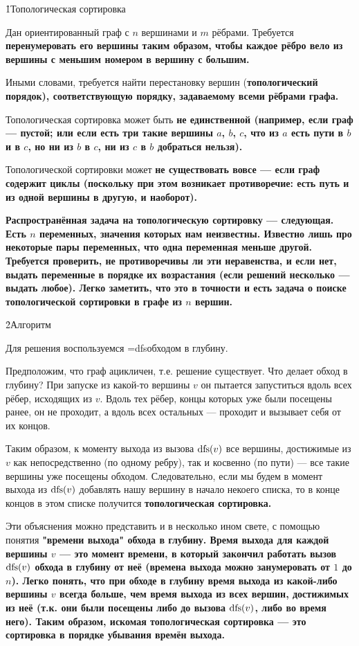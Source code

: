 \h1{Топологическая сортировка}

Дан ориентированный граф с $n$ вершинами и $m$ рёбрами. Требуется \bf{перенумеровать} его вершины таким образом, чтобы каждое рёбро вело из вершины с меньшим номером в вершину с большим.

Иными словами, требуется найти перестановку вершин (\bf{топологический порядок}), соответствующую порядку, задаваемому всеми рёбрами графа.

Топологическая сортировка может быть \bf{не единственной} (например, если граф --- пустой; или если есть три такие вершины $a$, $b$, $c$, что из $a$ есть пути в $b$ и в $c$, но ни из $b$ в $c$, ни из $c$ в $b$ добраться нельзя).

Топологической сортировки может \bf{не существовать} вовсе --- если граф содержит циклы (поскольку при этом возникает противоречие: есть путь и из одной вершины в другую, и наоборот).

\bf{Распространённая задача} на топологическую сортировку --- следующая. Есть $n$ переменных, значения которых нам неизвестны. Известно лишь про некоторые пары переменных, что одна переменная меньше другой. Требуется проверить, не противоречивы ли эти неравенства, и если нет, выдать переменные в порядке их возрастания (если решений несколько --- выдать любое). Легко заметить, что это в точности и есть задача о поиске топологической сортировки в графе из $n$ вершин.


\h2{Алгоритм}

Для решения воспользуемся \algohref=dfs{обходом в глубину}.

Предположим, что граф ацикличен, т.е. решение существует. Что делает обход в глубину? При запуске из какой-то вершины $v$ он пытается запуститься вдоль всех рёбер, исходящих из $v$. Вдоль тех рёбер, концы которых уже были посещены ранее, он не проходит, а вдоль всех остальных --- проходит и вызывает себя от их концов.

Таким образом, к моменту выхода из вызова ${\rm dfs}(v)$ все вершины, достижимые из $v$ как непосредственно (по одному ребру), так и косвенно (по пути) --- все такие вершины уже посещены обходом. Следовательно, если мы будем в момент выхода из ${\rm dfs}(v)$ добавлять нашу вершину в начало некоего списка, то в конце концов в этом списке получится \bf{топологическая сортировка}.

Эти объяснения можно представить и в несколько ином свете, с помощью понятия \bf{"времени выхода"} обхода в глубину. Время выхода для каждой вершины $v$ --- это момент времени, в который закончил работать вызов ${\rm dfs}(v)$ обхода в глубину от неё (времена выхода можно занумеровать от $1$ до $n$). Легко понять, что при обходе в глубину время выхода из какой-либо вершины $v$ всегда больше, чем время выхода из всех вершин, достижимых из неё (т.к. они были посещены либо до вызова ${\rm dfs}(v)$, либо во время него). Таким образом, искомая топологическая сортировка --- это сортировка в порядке убывания времён выхода.


